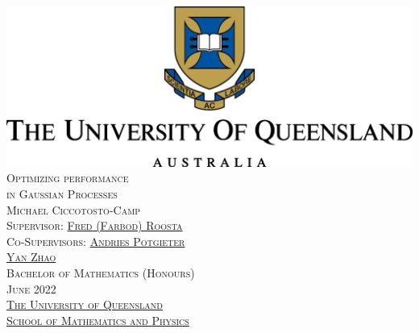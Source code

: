 \documentclass[11pt]{amsart}
\theoremstyle{remark}
\begin{document}
\thispagestyle{empty}
\begin{center}
	\includegraphics{university.png} \\
	\vspace{3cm}
	{\LARGE\textsc{Optimizing performance \\ in Gaussian Processes}} \\
	\vspace{0.3cm}
	{\textsc{Michael Ciccotosto-Camp}} \\
	\vspace{1cm}
	{\textsc{Supervisor: \href{https://people.smp.uq.edu.au/FredRoosta/}{Fred (Farbod) Roosta}}} \\
	{\textsc{Co-Supervisors: \href{https://researchers.uq.edu.au/researcher/2466}{Andries Potgieter} \\ \href{https://researchers.uq.edu.au/researcher/14230}{Yan Zhao}}} \\
	\vspace{5cm}
	{\textsc{Bachelor of Mathematics (Honours)}} \\
	{\textsc{June 2022}} \\
	\vspace{1cm}
	{\textsc{\href{https://www.uq.edu.au/}{The University of Queensland}}} \\
	{\textsc{\href{https://smp.uq.edu.au/}{School of Mathematics and Physics}}}
\end{center}
\newpage



\thispagestyle{empty}
\
\newpage

\tableofcontents
\setlength{\parindent}{0pt} %
\setlength{\parskip}{2mm}
\newpage
\end{document}

